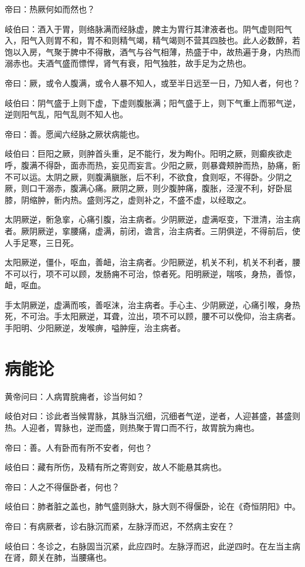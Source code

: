 \documentclass{article}%
\begin{document}
帝曰：热厥何如而然也？

岐伯曰：酒入于胃，则络脉满而经脉虚，脾主为胃行其津液者也。阴气虚则阳气入，阳气入则胃不和，胃不和则精气竭，精气竭则不营其四肢也。此人必数醉，若饱以入房，气聚于脾中不得散，酒气与谷气相薄，热盛于中，故热遍于身，内热而溺赤也。夫酒气盛而慓悍，肾气有衰，阳气独胜，故手足为之热也。

帝曰：厥，或令人腹满，或令人暴不知人，或至半日远至一日，乃知人者，何也？

岐伯曰：阴气盛于上则下虚，下虚则腹胀满；阳气盛于上，则下气重上而邪气逆，逆则阳气乱，阳气乱则不知人也。

帝曰：善。愿闻六经脉之厥状病能也。

岐伯曰：巨阳之厥，则肿首头重，足不能行，发为眴仆。阳明之厥，则癫疾欲走呼，腹满不得卧，面赤而热，妄见而妄言。少阳之厥，则暴聋颊肿而热，胁痛，䯒不可以运。太阴之厥，则腹满䐜胀，后不利，不欲食，食则呕，不得卧。少阴之厥，则口干溺赤，腹满心痛。厥阴之厥，则少腹肿痛，腹胀，泾溲不利，好卧屈膝，阴缩肿，䯒内热。盛则泻之，虚则补之，不盛不虚，以经取之。

太阴厥逆，䯒急挛，心痛引腹，治主病者。少阴厥逆，虚满呕变，下泄清，治主病者。厥阴厥逆，挛腰痛，虚满，前闭，谵言，治主病者。三阴俱逆，不得前后，使人手足寒，三日死。

太阳厥逆，僵仆，呕血，善衄，治主病者。少阳厥逆，机关不利，机关不利者，腰不可以行，项不可以顾，发肠痈不可治，惊者死。阳明厥逆，喘咳，身热，善惊，衄，呕血。

手太阴厥逆，虚满而咳，善呕沫，治主病者。手心主、少阴厥逆，心痛引喉，身热死，不可治。手太阳厥逆，耳聋，泣出，项不可以顾，腰不可以俛仰，治主病者。手阳明、少阳厥逆，发喉痹，嗌肿痓，治主病者。
\section{病能论}
黄帝问曰：人病胃脘痈者，诊当何如？

岐伯对曰：诊此者当候胃脉，其脉当沉细，沉细者气逆，逆者，人迎甚盛，甚盛则热。人迎者，胃脉也，逆而盛，则热聚于胃口而不行，故胃脘为痈也。

帝曰：善。人有卧而有所不安者，何也？

岐伯曰：藏有所伤，及精有所之寄则安，故人不能悬其病也。

帝曰：人之不得偃卧者，何也？

岐伯曰：肺者脏之盖也，肺气盛则脉大，脉大则不得偃卧，论在《奇恒阴阳》中。

帝曰：有病厥者，诊右脉沉而紧，左脉浮而迟，不然病主安在？

岐伯曰：冬诊之，右脉固当沉紧，此应四时。左脉浮而迟，此逆四时。在左当主病在肾，颇关在肺，当腰痛也。
\end{document}

